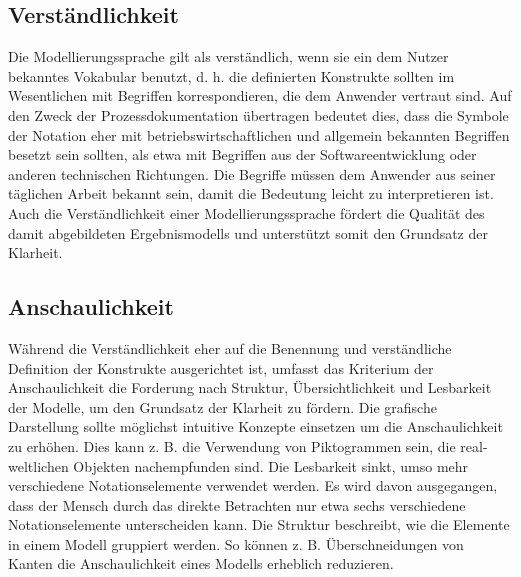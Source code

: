 \subsection{Verständlichkeit}
\label{sc:Verständlichkeit}
Die Modellierungssprache gilt als verständlich, wenn sie ein dem Nutzer bekanntes Vokabular benutzt, d. h. die definierten Konstrukte sollten im Wesentlichen mit Begriffen korrespondieren, die dem Anwender vertraut sind. Auf den Zweck der Prozessdokumentation übertragen bedeutet dies, dass die Symbole der Notation eher mit betriebswirtschaftlichen und allgemein bekannten Begriffen besetzt sein sollten, als etwa mit Begriffen aus der Softwareentwicklung oder anderen technischen Richtungen. Die Begriffe müssen dem Anwender aus seiner täglichen Arbeit bekannt sein, damit die Bedeutung leicht zu interpretieren ist. Auch die Verständlichkeit einer Modellierungssprache fördert die Qualität des damit abgebildeten Ergebnismodells und unterstützt somit den Grundsatz der Klarheit.

\subsection{Anschaulichkeit}
\label{sc:Anschaulichkeit}
Während die Verständlichkeit eher auf die Benennung und verständliche Definition der Konstrukte ausgerichtet ist, umfasst das Kriterium der Anschaulichkeit die Forderung nach Struktur, Übersichtlichkeit und Lesbarkeit der Modelle, um den Grundsatz der Klarheit zu fördern. Die grafische Darstellung sollte möglichst intuitive Konzepte einsetzen um die Anschaulichkeit zu erhöhen. Dies kann z. B. die Verwendung von Piktogrammen sein, die real-weltlichen Objekten nachempfunden sind. Die Lesbarkeit sinkt, umso mehr verschiedene Notationselemente verwendet werden. Es wird davon ausgegangen, dass der Mensch durch das direkte Betrachten nur etwa sechs verschiedene Notationselemente unterscheiden kann. Die Struktur beschreibt, wie die Elemente in einem Modell gruppiert werden. So können z. B. Überschneidungen von Kanten die Anschaulichkeit eines Modells erheblich reduzieren.


